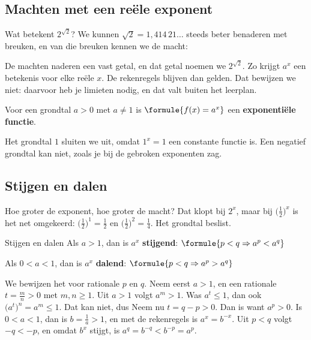 \subsection{Machten met een reële exponent}

Wat betekent $2^{\sqrt2}$? We kunnen $\sqrt2 = 1{,}414\,21\ldots$ steeds beter benaderen met breuken, en van die breuken kennen we de macht:


De machten naderen een vast getal, en dat getal noemen we $2^{\sqrt2}$. Zo krijgt $a^x$ een betekenis voor elke reële $x$. De rekenregels blijven dan gelden. Dat bewijzen we niet: daarvoor heb je limieten nodig, en dat valt buiten het leerplan.

\begin{theorie}
Voor een grondtal $a > 0$ met $a \neq 1$ is $\formule{f(x) = a^x}$ een \textbf{\textcolor{accent}{exponentiële functie}}.
\end{theorie}

Het grondtal $1$ sluiten we uit, omdat $1^x = 1$ een constante functie is. Een negatief grondtal kan niet, zoals je bij de gebroken exponenten zag.

\subsection{Stijgen en dalen}

Hoe groter de exponent, hoe groter de macht? Dat klopt bij $2^x$, maar bij $\bigl(\frac12\bigr)^x$ is het net omgekeerd: $\bigl(\frac12\bigr)^1 = \frac12$ en $\bigl(\frac12\bigr)^2 = \frac14$. Het grondtal beslist.

\begin{theorie}
\begin{stelling}{Stijgen en dalen}
Als $a > 1$, dan is $a^x$ \textbf{stijgend}: \qquad $\formule{p < q \Rightarrow a^p < a^q}$

Als $0 < a < 1$, dan is $a^x$ \textbf{dalend}: \qquad $\formule{p < q \Rightarrow a^p > a^q}$
\end{stelling}
\begin{bewijs}
We bewijzen het voor rationale $p$ en $q$. Neem eerst $a > 1$, en een rationale $t = \frac{m}{n} > 0$ met $m, n \geqslant 1$. Uit $a > 1$ volgt $a^m > 1$. Was $a^t \leqslant 1$, dan ook $\bigl(a^t\bigr)^n = a^m \leqslant 1$. Dat kan niet, dus
Neem nu $t = q - p > 0$. Dan is
want $a^p > 0$. Is $0 < a < 1$, dan is $b = \frac1a > 1$, en met de rekenregels is $a^x = b^{-x}$. Uit $p < q$ volgt $-q < -p$, en omdat $b^x$ stijgt, is $a^q = b^{-q} < b^{-p} = a^p$.
\end{bewijs}
\end{theorie}

